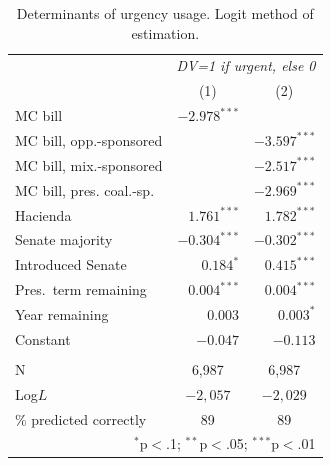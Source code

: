 \documentclass[letter,12pt]{article}
\begin{document}
\begin{table}
\centering
\begin{tabular}{lrr} 
 & \multicolumn{2}{c}{\textit{DV=1 if urgent, else 0}} \\ 
 & \multicolumn{1}{c}{(1)} & \multicolumn{1}{c}{(2)}\\ 
\hline
 MC bill & $-2.978^{***}$ &  \\ 
 MC bill, opp.-sponsored &  & $-3.597^{***}$ \\ 
 MC bill, mix.-sponsored &  & $-2.517^{***}$ \\ 
 MC bill, pres. coal.-sp. &  & $-2.969^{***}$ \\ 
 Hacienda & $1.761^{***}$ & $1.782^{***}$ \\ 
 Senate majority & $-0.304^{***}$ & $-0.302^{***}$ \\ 
 Introduced Senate & $0.184^{*}$ & $0.415^{***}$ \\ 
 Pres.~term remaining & $0.004^{***}$ & $0.004^{***}$ \\ 
 Year remaining  & $0.003$ & $0.003^{*}$ \\ 
 Constant & $-0.047$ & $-0.113$ \\ 
\hline \\[-1.8ex] 
N & \multicolumn{1}{c}{6,987} & \multicolumn{1}{c}{6,987} \\ 
Log$L$ & \multicolumn{1}{c}{$-2,057$} & \multicolumn{1}{c}{$-2,029$} \\ 
\% predicted correctly & \multicolumn{1}{c}{89} & \multicolumn{1}{c}{89} \\ \hline 
\multicolumn{3}{r}{\footnotesize{$^{*}$p$<$.1; $^{**}$p$<$.05; $^{***}$p$<$.01}} \\ 
\end{tabular} 
\caption{Determinants of urgency usage. Logit method of estimation.}\label{t:logit}
\end{table}
\end{document}
